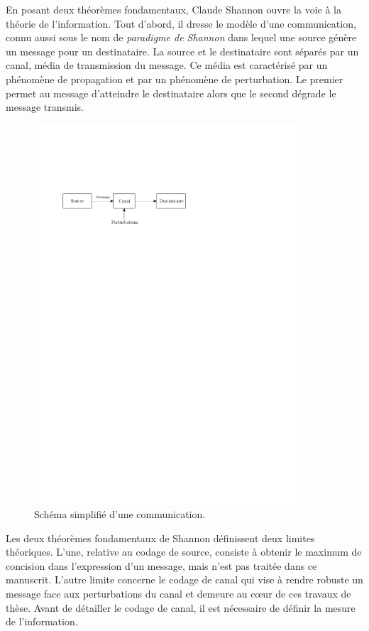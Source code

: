 En posant deux théorèmes fondamentaux, Claude Shannon ouvre la voie à la théorie de 
l'information. Tout d'abord, il dresse le modèle d'une communication, connu aussi sous le nom de 
\emph{paradigme de Shannon} dans lequel une source génère un message pour un destinataire. La source et le 
destinataire sont séparés par un canal, média de transmission du message. 
Ce média est caractérisé par un phénomène de propagation et par un phénomène de perturbation. Le premier permet au message 
d'atteindre le destinataire alors que le second dégrade le message transmis.

\begin{figure}[!h]
	\centering
	\includegraphics[width=10cm]{main/ch1_fig/shParadigm.pdf}
	\caption{\label{fig:paradigme} Schéma simplifié d'une communication.}
\end{figure}


Les deux théorèmes fondamentaux de Shannon définissent deux limites théoriques. L'une, relative au codage de source, 
consiste à obtenir le maximum de concision dans l'expression d'un message, mais n'est pas traitée dans ce manuscrit. 
L'autre limite concerne le codage de canal qui vise à rendre robuste un message face aux perturbations du canal et demeure au 
cœur de ces travaux de thèse. Avant de détailler le codage de canal, il est nécessaire de définir la mesure de l'information.
